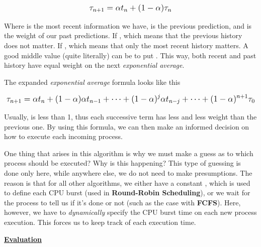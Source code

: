 \documentclass{article}
\newcommand{\code}[1]{\codeinline{\texttt{#1}}}
\begin{document}
\begin{equation}
  \mathlarger{\tau_{n+1} = \alpha t_{n} + (1 - \alpha)\tau_{n}}
\end{equation}

Where  is the most recent information we have,  is the previous prediction, and \scalebox{1.1}{\(\alpha\)} is the weight of our past predictions. If , which means that the previous history does not matter. If , which means that only the most recent history matters. A good middle value (quite literally) can be to put . This way, both recent and past history have equal weight on the next \textit{exponential average}.

The expanded \textit{exponential average} formula looks like this

\begin{equation}
  \mathlarger{\tau_{n+1} = \alpha t_{n} + (1 - \alpha)\alpha t_{n - 1} + \dots + (1 - \alpha)^{j} \alpha t_{n - j} + \dots + (1 - \alpha)^{n + 1} \tau_{0}}
\end{equation}

Usually, \scalebox{1.1}{\(\alpha\)} is less than 1, thus each successive term has less and less weight than the previous one. By using this formula, we can then make an informed decision on how to execute each incoming process.

One thing that arises in this algorithm is why we must make a guess as to which process should be executed? Why is this happening? This type of guessing is done only here, while anywhere else, we do not need to make presumptions. The reason is that for all other algorithms, we either have a constant \code{TIME\_QUANTUM}, which is used to define each CPU burst (used in \textbf{Round-Robin Scheduling}), or we wait for the process to tell us if it's done or not (such as the case with \textbf{FCFS}). Here, however, we have to \textit{dynamically} specify the CPU burst time on each new process execution. This forces us to keep track of each execution time.

\underline{\textbf{Evaluation}}
\end{document}
